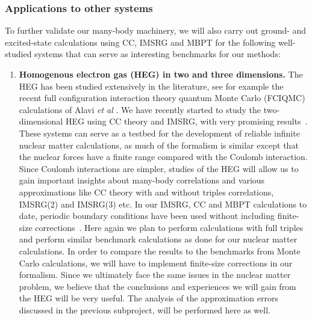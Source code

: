 \subsubsection{Applications to other systems}\label{subsec:othersystems}
To further validate our many-body machinery, we will also carry out
ground- and excited-state calculations using CC, IMSRG and MBPT
for the following well-studied systems that can serve as interesting
benchmarks for our methods:
\begin{enumerate}
\item{\bf Homogenous electron gas (HEG) in two and three dimensions.}
  The HEG has been studied extensively in the literature, see for
  example the recent full configuration interaction theory quantum Monte Carlo (FCIQMC) calculations of Alavi {\em et al}
  \cite{booth2009,booth2013}. We have recently started to study the
  two-dimensional HEG using CC theory and IMSRG,
  with very promising results~\cite{Baardsen:2013vwa,audunthesis}. These systems can
  serve as a testbed for the development of reliable infinite nuclear
  matter calculations, as much of the formalism is similar except that
  the nuclear forces have a finite range compared with the Coulomb
  interaction. Since Coulomb interactions are simpler, studies of the
  HEG will allow us to gain important insights about many-body
  correlations and various approximations like CC theory with and
  without triples correlations, IMSRG(2) and IMSRG(3) etc. In our
  IMSRG, CC and MBPT calculations to date, periodic boundary
  conditions have been used without including finite-size
  corrections~\cite{Baardsen:2013vwa, audunthesis}. Here again we plan to perform calculations with full triples
 and perform similar benchmark calculations as done for our nuclear matter calculations. 
  In order to compare the results to
  the benchmarks from Monte Carlo calculations, we will have to implement finite-size corrections in our
  formalism. Since we ultimately face the same issues in the nuclear
  matter problem, we believe that the conclusions and experiences we
  will gain from the HEG will be very useful.  The analysis of the approximation errors discussed in the previous subproject, will be performed here as well.
 

\end{enumerate}
